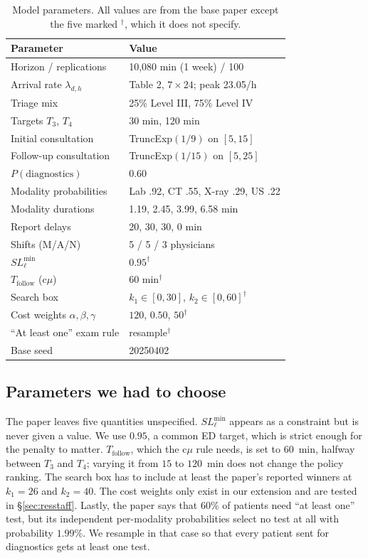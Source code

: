 \documentclass[sigconf,nonacm]{acmart}
\begin{document}
\begin{table}[t]
\caption{Model parameters. All values are from the base paper except the five
         marked $^\dagger$, which it does not specify.}
\label{tab:params}
\small
\begin{tabular}{@{}p{3.6cm}p{4.0cm}@{}}
\toprule
\textbf{Parameter} & \textbf{Value} \\
\midrule
Horizon / replications      & 10{,}080 min (1 week) / 100 \\
Arrival rate $\lambda_{d,h}$& Table 2, $7\times24$; peak 23.05/h \\
Triage mix                  & 25\% Level III, 75\% Level IV \\
Targets $T_3$, $T_4$        & 30 min, 120 min \\
Initial consultation        & TruncExp$(1/9)$ on $[5,15]$ \\
Follow-up consultation      & TruncExp$(1/15)$ on $[5,25]$ \\
$P(\text{diagnostics})$     & 0.60 \\
Modality probabilities      & Lab .92, CT .55, X-ray .29, US .22 \\
Modality durations          & 1.19, 2.45, 3.99, 6.58 min \\
Report delays               & 20, 30, 30, 0 min \\
Shifts (M/A/N)              & 5 / 5 / 3 physicians \\
\midrule
$SL^{\min}_\ell$            & $0.95^\dagger$ \\
$T_{\text{follow}}$ (c$\mu$)& $60$ min$^\dagger$ \\
Search box                  & $k_1\in[0,30]$, $k_2\in[0,60]^\dagger$ \\
Cost weights $\alpha,\beta,\gamma$ & $120$, $0.50$, $50^\dagger$ \\
``At least one'' exam rule  & resample$^\dagger$ \\
\midrule
Base seed                   & 20250402 \\
\bottomrule
\end{tabular}
\end{table}

\subsection{Parameters we had to choose}
The paper leaves five quantities unspecified. $SL^{\min}_\ell$ appears as a
constraint but is never given a value. We use $0.95$, a common ED target, which
is strict enough for the penalty to matter. $T_{\text{follow}}$, which the
c$\mu$ rule needs, is set to $60$~min, halfway between $T_3$ and $T_4$; varying
it from $15$ to $120$~min does not change the policy ranking. The search box
has to include at least the paper's reported winners at $k_1=26$ and $k_2=40$.
The cost weights only exist in our extension and are tested in
\S\ref{sec:resstaff}. Lastly, the paper says that $60\%$ of patients need ``at
least one'' test, but its independent per-modality probabilities select no test
at all with probability $1.99\%$. We resample in that case so that every
patient sent for diagnostics gets at least one test.
\end{document}
